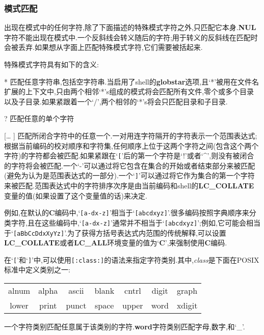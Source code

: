 \documentclass[draft,openany]{book}
\begin{document}
\begin{CJK}{UTF8}{gbsn}
    \subsubsection{模式匹配}
    出现在模式中的任何字符,除了下面描述的特殊模式字符之外,只匹配它本身.\textbf{NUL}字符不能出现在模式中.一个反斜线会转义随后的字符;用于转义的反斜线在匹配时会被丢弃.如果想从字面上匹配特殊模式字符,它们需要被括起来.\par
    特殊模式字符具有如下的含义:
    \begin{basedescript}{\desclabelstyle{\nextlinelabel}\desclabelwidth{2.5em}}
    \item[*] 匹配任意字符串,包括空字符串.当启用了shell的\textbf{globstar}选项,且`*'被用在文件名扩展的上下文中,只由两个相邻`*'s组成的模式将会匹配所有文件,零个或多个目录以及子目录.如果紧跟着一个`/',两个相邻的`*'s将会只匹配目录和子目录.
    \item[?] 匹配任意的单个字符
    \item[[\dots]] 匹配所闭合字符中的任意一个.一对用连字符隔开的字符表示一个范围表达式;根据当前编码的校对顺序和字符集,任何顺序上位于这两个字符之间(包含这个两个字符)的字符都会被匹配.如果紧跟在`\verb+[+'后的第一个字符是`!'或者`\^{}',则没有被闭合的字符将会被匹配.一个`-'可以通过将它包含在集合的开始或者结束部分来被匹配(避免为认为是范围表达式的一部分).一个`\verb+]+'可以通过将它作为集合的第一个字符来被匹配.范围表达式中的字符排序次序是由当前编码和shell的\textbf{LC\_COLLATE}变量的值(如果设置了这个变量值的话)来决定.\par
        例如,在默认的\textbf{C}编码中,`\verb+[a-dx-z]+'相当于`\verb+[abcdxyz]+'.很多编码按照字典顺序来分类字符,且在这些编码中,`\verb+[a-dx-z]+'通常并不相当于`\verb+[abcdxyz]+';例如,它可能会相当于`\verb+[aBbCcDdxXyYz]+'.为了获得方括号表达式内范围的传统解释,可以设置\textbf{LC\_COLLATE}或者\textbf{LC\_ALL}环境变量的值为`\textbf{C}',来强制使用\textbf{C}编码.\par
        在`\verb+[+'和`\verb+]+'中,可以使用\verb+[:class:]+的语法来指定字符类别.其中,\emph{class}是下面在POSIX标准中定义类别之一:
        \begin{center}
            \begin{tabular}{c c c c c c c}
                alnum & alpha & ascii & blank & cntrl & digit & graph \\
                lower & print & punct & space & upper & word & xdigit \\
            \end{tabular}
        \end{center}
        一个字符类别匹配任意属于该类别的字符.\textbf{word}字符类别匹配字母,数字,和`\_'.\par

\end{basedescript}
\end{CJK}
\end{document}
